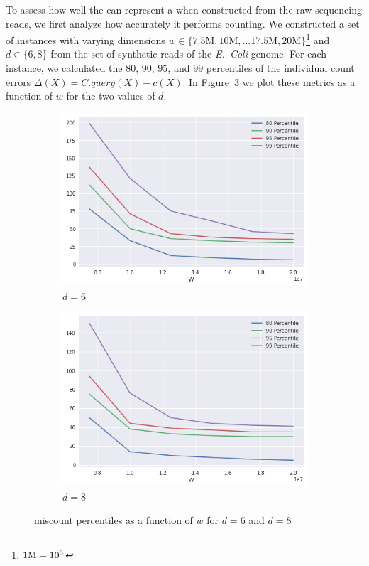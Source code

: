 To assess how well the \dBCM can represent a \dBG when constructed from the raw sequencing reads, we first analyze how accurately it performs \kmer counting. We constructed a set of \dBCM instances with varying dimensions $w \in \{7.5\text{M}, 10\text{M}, \ldots 17.5\text{M}, 20\text{M}\}$\footnote{$1\mega = 10^6$} and $d \in \{6, 8\}$ from the set of synthetic reads of the \emph{E.~Coli} genome. For each instance, we calculated the $80$, $90$, $95$, and $99$ percentiles of the individual count errors $\Delta(X) = C.\mathit{query}(X) - c(X)$. In Figure~\ref{fig:ecoli-art-dbcm-errors} we plot these metrics as a function of $w$ for the two values of $d$.

\begin{figure}[htb]
    \centering
    \begin{subfigure}{.5\textwidth}
        \centering
        \includegraphics[width=\textwidth]{figures/e_coli-dbcm-error_percentiles-K31-D6}
        \caption{$d = 6$}\label{fig:ecoli-art-dbcm-errors-d6}
    \end{subfigure}%
    \begin{subfigure}{.5\textwidth}
        \centering
        \includegraphics[width=\textwidth]{figures/e_coli-dbcm-error_percentiles-K31-D8}
        \caption{$d = 8$}\label{fig:ecoli-art-dbcm-errors-d8}
    \end{subfigure}
	\caption{\dBCM miscount percentiles as a function of $w$ for $d = 6$ and $d = 8$}\label{fig:ecoli-art-dbcm-errors}
\end{figure}

